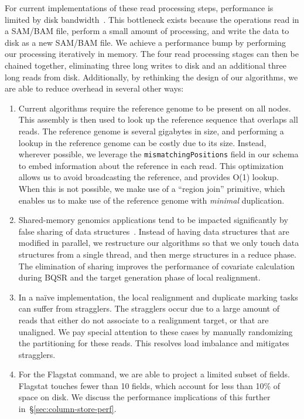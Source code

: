 \documentclass[masters]{ucbthesis}
\begin{document}
For current implementations of these read processing steps, performance is limited by disk
bandwidth~\cite{diao15}. This bottleneck exists because the operations read in a SAM/BAM file, perform
a small amount of processing, and write the data to disk as a new SAM/BAM file. We achieve a
performance bump by performing our processing iteratively in memory. The four read processing stages
can then be chained together, eliminating three long writes to disk and an additional three long reads
from disk. Additionally, by rethinking the design of our algorithms, we are able to reduce overhead in
several other ways:

\begin{enumerate}
\item Current algorithms require the reference genome to be present on all nodes. This assembly is then
used to look up the reference sequence that overlaps all reads. The reference genome is several
gigabytes in size, and performing a lookup in the reference genome can be costly due to its size. Instead,
wherever possible, we leverage the \texttt{mismatchingPositions} field in our schema to embed
information about the reference in each read. This optimization allows us to avoid broadcasting the
reference, and provides O(1) lookup. When this is not possible, we make use of a ``region join'' primitive,
which enables us to make use of the reference genome with \emph{minimal} duplication.
\item Shared-memory genomics applications tend to be impacted significantly by false sharing of data
structures~\cite{zaharia11}. Instead of having data structures that are modified in parallel, we
restructure our algorithms so that we only touch data structures from a single thread, and then merge
structures in a reduce phase. The elimination of sharing improves the performance of covariate
calculation during BQSR and the target generation phase of local realignment.
\item In a na\"{i}ve implementation, the local realignment and duplicate marking tasks can suffer from
stragglers. The stragglers occur due to a large amount of reads that either do not associate to a
realignment target, or that are unaligned. We pay special attention to these cases by manually
randomizing the partitioning for these reads. This resolves load imbalance and mitigates stragglers.
\item For the Flagstat command, we are able to project a limited subset of fields. Flagstat touches fewer
than 10 fields, which account for less than 10\% of space on disk. We discuss the performance
implications of this further in~\S\ref{sec:column-store-perf}.
\end{enumerate}
\end{document}
